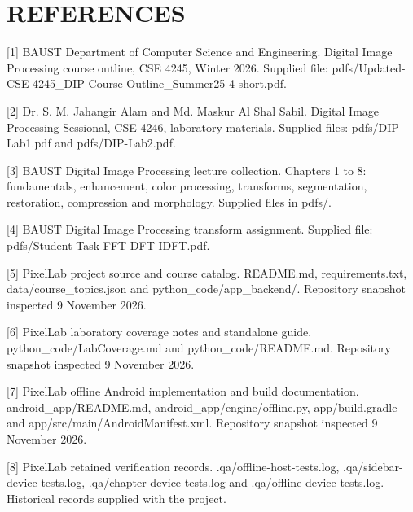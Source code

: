 \chapter*{REFERENCES}[1] BAUST Department of Computer Science and Engineering. Digital Image Processing course outline, CSE 4245, Winter 2026. Supplied file: pdfs/Updated-CSE 4245\_DIP-Course Outline\_Summer25-4-short.pdf.

[2] Dr. S. M. Jahangir Alam and Md. Maskur Al Shal Sabil. Digital Image Processing Sessional, CSE 4246, laboratory materials. Supplied files: pdfs/DIP-Lab1.pdf and pdfs/DIP-Lab2.pdf.

[3] BAUST Digital Image Processing lecture collection. Chapters 1 to 8: fundamentals, enhancement, color processing, transforms, segmentation, restoration, compression and morphology. Supplied files in pdfs/.

[4] BAUST Digital Image Processing transform assignment. Supplied file: pdfs/Student Task-FFT-DFT-IDFT.pdf.

[5] PixelLab project source and course catalog. README.md, requirements.txt, data/course\_topics.json and python\_code/app\_backend/. Repository snapshot inspected 9 November 2026.

[6] PixelLab laboratory coverage notes and standalone guide. python\_code/LabCoverage.md and python\_code/README.md. Repository snapshot inspected 9 November 2026.

[7] PixelLab offline Android implementation and build documentation. android\_app/README.md, android\_app/engine/offline.py, app/build.gradle and app/src/main/AndroidManifest.xml. Repository snapshot inspected 9 November 2026.

[8] PixelLab retained verification records. .qa/offline-host-tests.log, .qa/sidebar-device-tests.log, .qa/chapter-device-tests.log and .qa/offline-device-tests.log. Historical records supplied with the project.